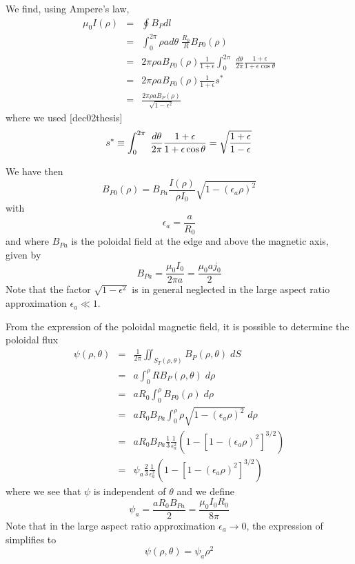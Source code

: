 \documentclass{article}
\begin{document}
We find, using Ampere's law, 
\begin{eqnarray*}
\mu _{0}I\left( \rho \right)  &=&\oint B_{P}dl \\
&=&\int_{0}^{2\pi }\rho ad\theta \;\frac{R_{0}}{R}B_{P0}\left( \rho \right) 
\\
&=&2\pi \rho aB_{P0}\left( \rho \right) \frac{1}{1+\epsilon }\int_{0}^{2\pi %
}\;\frac{d\theta }{2\pi }\frac{1+\epsilon }{1+\epsilon \cos \theta } \\
&=&2\pi \rho aB_{P0}\left( \rho \right) \frac{1}{1+\epsilon }s^{*} \\
&=&\frac{2\pi \rho aB_{P}\left( \rho \right) }{\sqrt{1-\epsilon ^{2}}}
\end{eqnarray*}
where we used [dec02thesis] 
\begin{equation}
s^{*}\equiv \int_{0}^{2\pi }\;\frac{d\theta }{2\pi }\frac{1+\epsilon }{%
1+\epsilon \cos \theta }=\sqrt{\frac{1+\epsilon }{1-\epsilon }}
\label{sstar}
\end{equation}

We have then 
\[
B_{P0}\left( \rho \right) =B_{Pa}\frac{I\left( \rho \right) }{\rho I_{0}}%
\sqrt{1-\left( \epsilon _{a}\rho \right) ^{2}} 
\]
with 
\begin{equation}
\epsilon _{a}=\frac{a}{R_{0}}
\end{equation}
and where $B_{Pa}$ is the poloidal field at the edge and above the magnetic
axis, given by 
\[
B_{Pa}=\frac{\mu _{0}I_{0}}{2\pi a}=\frac{\mu _{0}aj_{0}}{2} 
\]
Note that the factor $\sqrt{1-\epsilon ^{2}}$ is in general neglected in the
large aspect ratio approximation $\epsilon _{a}\ll 1$.

From the expression of the poloidal magnetic field, it is possible to
determine the poloidal flux 
\begin{eqnarray*}
\psi \left( \rho ,\theta \right) &=&\frac{1}{2\pi }\iint_{S_{T}\left( \rho
,\theta \right) }B_{P}\left( \rho ,\theta \right) \;dS \\
&=&a\int_{0}^{\rho }RB_{P}\left( \rho ,\theta \right) \;d\rho \\
&=&aR_{0}\int_{0}^{\rho }B_{P0}\left( \rho \right) \;d\rho \\
&=&aR_{0}B_{Pa}\int_{0}^{\rho }\rho \sqrt{1-\left( \epsilon _{a}\rho \right)
^{2}}\;d\rho \\
&=&aR_{0}B_{Pa}\frac{1}{3}\frac{1}{\epsilon _{a}^{2}}\left( 1-\left[
1-\left( \epsilon _{a}\rho \right) ^{2}\right] ^{3/2}\right) \\
&=&\psi _{a}\frac{2}{3}\frac{1}{\epsilon _{a}^{2}}\left( 1-\left[ 1-\left(
\epsilon _{a}\rho \right) ^{2}\right] ^{3/2}\right)
\end{eqnarray*}
where we see that $\psi $ is independent of $\theta $ and we define 
\[
\psi _{a}=\frac{aR_{0}B_{Pa}}{2}=\frac{\mu _{0}I_{0}R_{0}}{8\pi } 
\]
Note that in the large aspect ratio approximation $\epsilon _{a}\rightarrow
0 $, the expression of simplifies to 
\begin{equation}
\psi \left( \rho ,\theta \right) =\psi _{a}\rho ^{2}
\end{equation}
\end{document}
